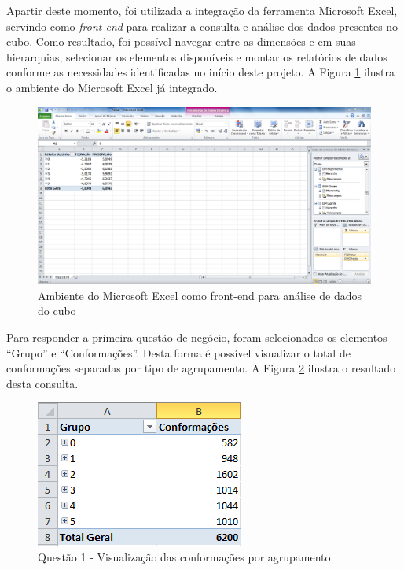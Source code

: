 Apartir deste momento, foi utilizada a integração da ferramenta Microsoft Excel, servindo como \emph{front-end} para realizar a consulta e análise dos dados presentes no cubo. Como resultado, foi possível navegar entre as dimensões e em suas hierarquias, selecionar os elementos disponíveis e montar os relatórios de dados conforme as necessidades identificadas no início deste projeto. A Figura \ref{fig:excelFull} ilustra o ambiente do Microsoft Excel já integrado.

\begin{figure}[h]
        \center
        \includegraphics[scale=0.45]{images/ExcelFull.PNG}
        \caption{Ambiente do Microsoft Excel como front-end para análise de dados do cubo}
        \label{fig:excelFull}
\end{figure}

Para responder a primeira questão de negócio, foram selecionados os elementos ``Grupo'' e ``Conformações''. Desta forma é possível visualizar o total de conformações separadas por tipo de agrupamento. A Figura \ref{fig:questao1} ilustra o resultado desta consulta.

\begin{figure}[h]
        \center
        \includegraphics[scale=1]{images/Questao1.PNG}
        \caption{Questão 1 - Visualização das conformações por agrupamento.}
        \label{fig:questao1}
\end{figure}

